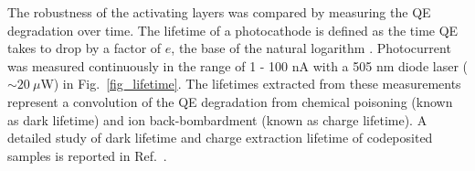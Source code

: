 
	


The robustness of the activating layers was compared by measuring the QE degradation over time. The lifetime of a photocathode is defined as the time QE takes to drop by a factor of $e$, the base of the natural logarithm \cite{bae2018_RuggedSpinpolarizedElectron,grames2011_ChargeFluenceLifetime}.
Photocurrent was measured continuously in the range of 1 - 100 nA with a 505 nm diode laser ($\sim 20 \: \mu$W) in Fig.~\ref{fig_lifetime}. The lifetimes extracted from these measurements represent a convolution of the QE degradation from chemical poisoning (known as dark lifetime) and ion back-bombardment (known as charge lifetime).
A detailed study of dark lifetime and charge extraction lifetime of codeposited samples is reported in Ref.~\cite{cultrera2020_LongLifetimePolarized}.

